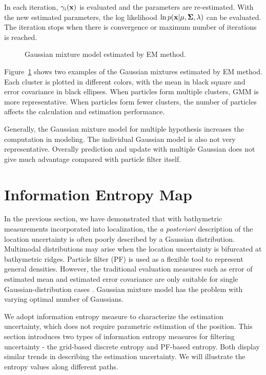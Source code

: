In each iteration, $\gamma_i({\bf x})$ is evaluated and the parameters are re-estimated. With the new estimated parameters, the log likelihood $\ln p({\bf x}|{\bf \mu},{\bf\Sigma},{\lambda})$ can be evaluated. The iteration stops when there is convergence or maximum number of iterations is reached.

\begin{figure}[htbp]
\begin{center}
\caption{Gaussian mixture model estimated by EM method.}
\label{fig:GMMEM}
\end{center}
\end{figure}

Figure~\ref{fig:GMMEM} shows two examples of the Gaussian mixtures estimated by EM method. Each cluster is plotted in different colors, with the mean in black square and error covariance in black ellipses. When particles form multiple clusters, GMM is more representative. When particles form fewer clusters, the number of particles affects the calculation and estimation performance. 

Generally, the Gaussian mixture model for multiple hypothesis increases the computation in modeling. The individual Gaussian model is also not very representative. Overally prediction and update with multiple Gaussian does not give much advantage compared with particle filter itself.

\section{Information Entropy Map}

In the previous section, we have demonstrated that with bathymetric measurements incorporated into localization, the \textit{a posteriori} description of the location uncertainty is often poorly described by a Gaussian distribution. Multimodal distributions may arise when the location uncertainty is bifurcated at bathymetric ridges. Particle filter (PF) is used as a flexible tool to represent general densities. However, the traditional evaluation measures such as error of estimated mean and estimated error covariance are only suitable for single Gaussian-distribution cases \cite{Chou2011}. Gaussian mixture model has the problem with varying optimal number of Gaussians. 

We adopt information entropy measure to characterize the estimation uncertainty, which does not require parametric estimation of the position. This section introduces two types of information entropy measures for filtering uncertainty - the grid-based discrete entropy and PF-based entropy. Both display similar trends in describing the estimation uncertainty. We will illustrate the entropy values along different paths.

